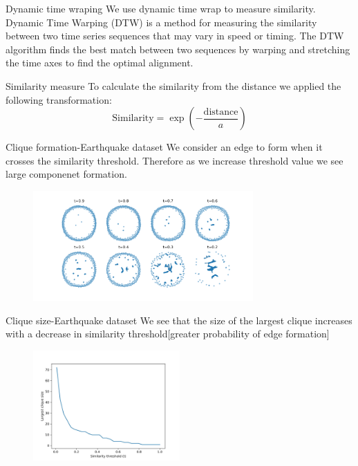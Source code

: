 \begin{frame}{Dynamic time wraping}
    We use dynamic time wrap to measure similarity. Dynamic Time Warping (DTW) is a method for measuring the similarity between two time series sequences that may vary in speed or timing. The DTW algorithm finds the best match between two sequences by warping and stretching the time axes to find the optimal alignment.
\end{frame}

\begin{frame}{Similarity measure}
    To calculate the similarity from the distance we applied the following transformation:
$$
\text{Similarity} = \exp\left(-\frac{\text{distance}}{a}\right)
$$
\end{frame}

\begin{frame}{Clique formation-Earthquake dataset}
We consider an edge to form when it crosses the similarity threshold. Therefore as we increase threshold value we see large componenet formation. 
\begin{figure}
    \centering
    \includegraphics[width=0.75\textwidth]{images/earthquakemultigraphs.png}
\end{figure}
\end{frame}
\begin{frame}{Clique size-Earthquake dataset}
We see that the size of the largest clique increases with a decrease in similarity threshold[greater probability of edge formation]
\begin{figure}
    \centering
    \includegraphics[width=0.5\textwidth]{images/cliquesize.jpg}
\end{figure}
\end{frame}
